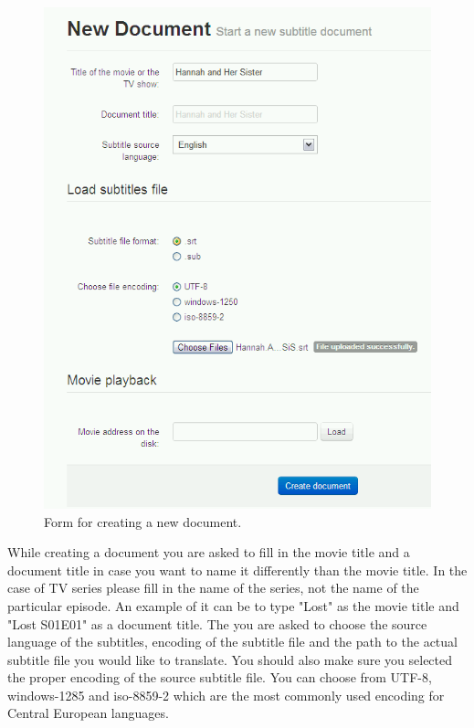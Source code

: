 \begin{figure}
\begin{center}
\includegraphics[scale=0.4]{figures/user_manual/new_document.png}
\end{center}
\caption{Form for creating a new document.}
\end{figure}

While creating a document you are asked to fill in the movie title and a document title in case you want to name it differently than the movie title. In the case of TV series please fill in the name of the series, not the name of the particular episode. An example of it can be to type "Lost" as the movie title and "Lost S01E01" as a document title. The you are asked to choose the source language of the subtitles, encoding of the subtitle file and the path to the actual subtitle file you would like to translate. You should also make sure you selected the proper encoding of the source subtitle file. You can choose from UTF-8, windows-1285 and iso-8859-2 which are the most commonly used encoding for Central European languages.

